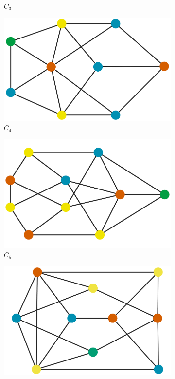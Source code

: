 \documentclass[12pt]{amsart}
\theoremstyle{plain}
\numberwithin{equation}{section}
\begin{document}
\begin{figure}[H]
\begin{subfigure}[b]{0.22\textwidth}
		\caption{$C_3$}
	\end{subfigure}
	\hfill
	\begin{subfigure}[b]{0.22\textwidth}
		\centering
		\includegraphics[width =\columnwidth]{./figures/C4_dg.pdf}
		\caption{$C_4$}
	\end{subfigure}
	\hfill
	\begin{subfigure}[b]{0.22\textwidth}
		\centering
		\includegraphics[width =\columnwidth]{./figures/C5_dg.pdf}
		\caption{$C_5$}
	\end{subfigure}
	\hfill
	\begin{subfigure}[b]{0.22\textwidth}
		\centering
		\includegraphics[width =\columnwidth]{./figures/C6_dg.pdf}

\end{subfigure}
\end{figure}
\end{document}
